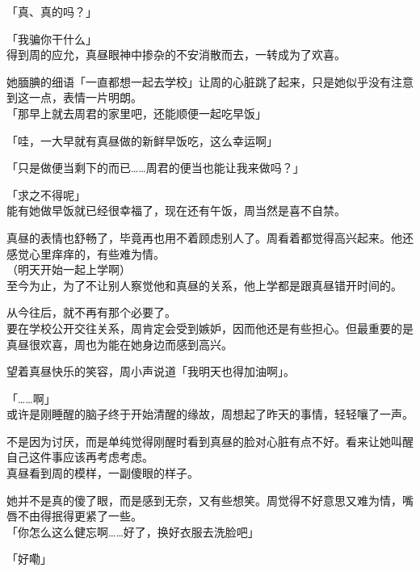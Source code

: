 「真、真的吗？」

「我骗你干什么」\\

得到周的应允，真昼眼神中掺杂的不安消散而去，一转成为了欢喜。

她腼腆的细语「一直都想一起去学校」让周的心脏跳了起来，只是她似乎没有注意到这一点，表情一片明朗。\\

「那早上就去周君的家里吧，还能顺便一起吃早饭」

「哇，一大早就有真昼做的新鲜早饭吃，这么幸运啊」

「只是做便当剩下的而已……周君的便当也能让我来做吗？」

「求之不得呢」\\

能有她做早饭就已经很幸福了，现在还有午饭，周当然是喜不自禁。

真昼的表情也舒畅了，毕竟再也用不着顾虑别人了。周看着都觉得高兴起来。他还感觉心里痒痒的，有些难为情。\\

（明天开始一起上学啊）\\

至今为止，为了不让别人察觉他和真昼的关系，他上学都是跟真昼错开时间的。

从今往后，就不再有那个必要了。\\

要在学校公开交往关系，周肯定会受到嫉妒，因而他还是有些担心。但最重要的是真昼很欢喜，周也为能在她身边而感到高兴。

望着真昼快乐的笑容，周小声说道「我明天也得加油啊」。\\

\vspace{2\baselineskip}

「……啊」\\

或许是刚睡醒的脑子终于开始清醒的缘故，周想起了昨天的事情，轻轻嚷了一声。

不是因为讨厌，而是单纯觉得刚醒时看到真昼的脸对心脏有点不好。看来让她叫醒自己这件事应该再考虑考虑。\\

真昼看到周的模样，一副傻眼的样子。

她并不是真的傻了眼，而是感到无奈，又有些想笑。周觉得不好意思又难为情，嘴唇不由得抿得更紧了一些。\\

「你怎么这么健忘啊……好了，换好衣服去洗脸吧」

「好嘞」\\

